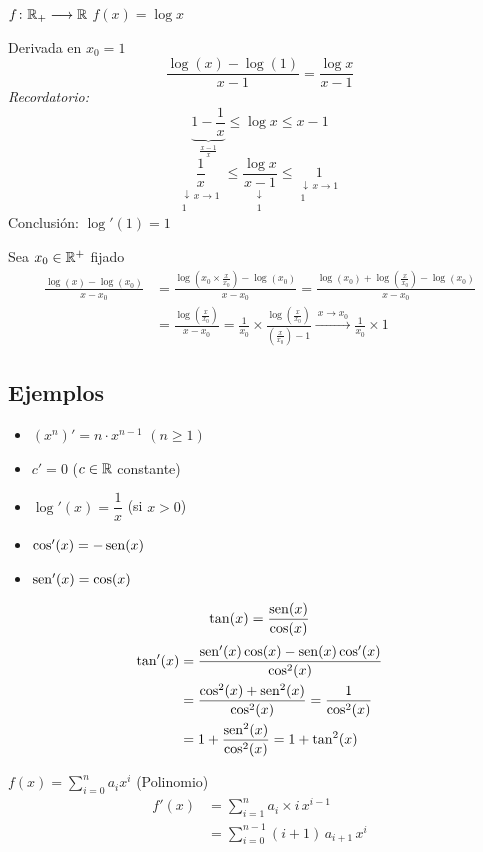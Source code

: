 \documentclass[11pt,a4paper]{article}
\newcommand{\abajo}[3][]{\underset{\substack{\downarrow\,#1\\ #3}}{#2}}
\begin{document}
\begin{ejemplo}
  $f\colon\mathbb{R}_+\longrightarrow\mathbb{R}$ \quad $f(x)=\log x$

  Derivada en $x_0=1$
  \[
    \frac{\log(x)-\log(1)}{x-1}=\frac{\log x}{x-1}
  \]
  \textit{Recordatorio:}
  \[
    \underbrace{1-\frac{1}{x}}_{\frac{x-1}{x}}\leq\log x\leq x-1
  \]
  \[
    \abajo[x\to 1]{\frac{1}{x}}{1}\leq\abajo{\frac{\log x}{x-1}}{1}
    \leq\abajo[x\to 1]{1}{1}
  \]
  Conclusión: $\log'(1)=1$

  Sea $x_0\in\mathbb{R}^+$ fijado
  \begin{align*}
    \frac{\log(x)-\log(x_0)}{x-x_0}
    &=\frac{\log\left(x_0\times\frac{x}{x_0}\right)-\log(x_0)}{x-x_0}
     =\frac{\log(x_0)+\log\left(\frac{x}{x_0}\right)-\log(x_0)}{x-x_0}\\
    &=\frac{\log\left(\frac{x}{x_0}\right)}{x-x_0}
     =\frac{1}{x_0}\times\frac{\log\left(\frac{x}{x_0}\right)}
       {\left(\frac{x}{x_0}\right)-1}
     \xrightarrow{\ x\to x_0\ }\frac{1}{x_0}\times 1
  \end{align*}
\end{ejemplo}


\subsection{Ejemplos}

\begin{itemize}
  \item $(x^n)'=n\cdot x^{n-1}$ \quad $(n\geq 1)$
  \item $c'=0$ \quad ($c\in\mathbb{R}$ constante)
  \item $\log'(x)=\dfrac{1}{x}$ \quad (si $x>0$)
  \item $\cos'(x)=-\operatorname{sen}(x)$
  \item $\operatorname{sen}'(x)=\cos(x)$
\end{itemize}

\[
  \tan(x)=\frac{\operatorname{sen}(x)}{\cos(x)}
\]
\begin{align*}
  \tan'(x)&=\frac{\operatorname{sen}'(x)\cos(x)-\operatorname{sen}(x)\cos'(x)}{\cos^2(x)}\\
  &=\frac{\cos^2(x)+\operatorname{sen}^2(x)}{\cos^2(x)}=\frac{1}{\cos^2(x)}\\
  &=1+\frac{\operatorname{sen}^2(x)}{\cos^2(x)}=1+\tan^2(x)
\end{align*}

\begin{observacion}
  $\displaystyle f(x)=\sum_{i=0}^{n}a_i x^i$ \quad (Polinomio)
  \begin{align*}
    f'(x)&=\sum_{i=1}^{n}a_i\times i\,x^{i-1}\\
    &=\sum_{i=0}^{n-1}(i+1)\,a_{i+1}\,x^i
  \end{align*}
\end{observacion}
\end{document}
